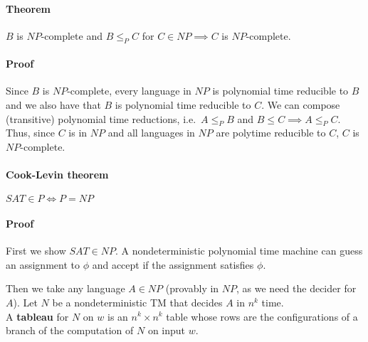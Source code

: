 \documentclass[12 pt]{article}
\begin{document}
\paragraph{Theorem} $B$ is $NP$-complete and $B \leq_P C$ for $C \in
NP \implies C$ is $NP$-complete.
\paragraph{Proof} Since $B$ is $NP$-complete, every language in $NP$
is polynomial time reducible to $B$ and we also have that $B$ is
polynomial time reducible to $C$. We can compose (transitive) polynomial time
reductions, i.e.\ $A \leq_P B$ and $B \leq C \implies A \leq_P
C$. Thus, since $C$ is in $NP$ and all languages in $NP$ are polytime
reducible to $C$, $C$ is $NP$-complete.
\paragraph{Cook-Levin theorem} $SAT \in P \iff P = NP$
\paragraph{Proof} First we show $SAT \in NP$. A nondeterministic
polynomial time machine can guess an assignment to $\phi$ and accept
if the assignment satisfies $\phi$.

Then we take any language $A \in NP$ (provably in $NP$, as we need the
decider for $A$). Let $N$ be a
nondeterministic TM that decides $A$ in $n^k$ time.
\\ A \textbf{tableau} for $N$ on $w$ is an $n^k \times n^k$ table
whose rows are the configurations of a branch of the computation of
$N$ on input $w$.
\end{document}
